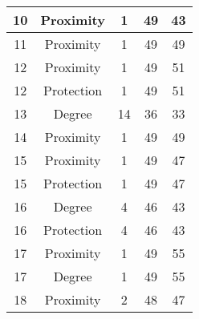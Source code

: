 \documentclass[results.tex]{subfiles}
\begin{document}
\begin{center}
\begin{tabular}{| c || c | c | c | c |}
            \hline
            10                      & Proximity                    & 1                      & 49                      & 43                   \\
            \hline
            11                      & Proximity                    & 1                      & 49                      & 49                   \\
            \hline
            12                      & Proximity                    & 1                      & 49                      & 51                   \\
            \hline
            12                      & Protection                   & 1                      & 49                      & 51                   \\
            \hline
            13                      & Degree                       & 14                     & 36                      & 33                   \\
            \hline
            14                      & Proximity                    & 1                      & 49                      & 49                   \\
            \hline
            15                      & Proximity                    & 1                      & 49                      & 47                   \\
            \hline
            15                      & Protection                   & 1                      & 49                      & 47                   \\
            \hline
            16                      & Degree                       & 4                      & 46                      & 43                   \\
            \hline
            16                      & Protection                   & 4                      & 46                      & 43                   \\
            \hline
            17                      & Proximity                    & 1                      & 49                      & 55                   \\
            \hline
            17                      & Degree                       & 1                      & 49                      & 55                   \\
            \hline
            18                      & Proximity                    & 2                      & 48                      & 47                   \\

\end{tabular}
\end{center}
\end{document}
